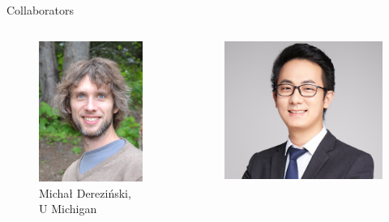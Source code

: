 \begin{frame}{Collaborators}
\begin{columns}[c]
\begin{column}{0.24\textwidth}
\begin{figure}
        \includegraphics[width=\textwidth,clip,trim={0 3cm 0 2cm}]{Figures/intro/michal.jpg}
        \caption{\tiny Michał Dereziński,\\ U Michigan}
    \end{figure}
    \end{column}
    \begin{column}{0.24\textwidth}
    \begin{figure}
        \centering
        \includegraphics[width=\textwidth,clip,trim={8cm 0 3cm 0}]{Figures/intro/zhenyu.jpeg}

\end{figure}
\end{column}
\end{columns}
\end{frame}
